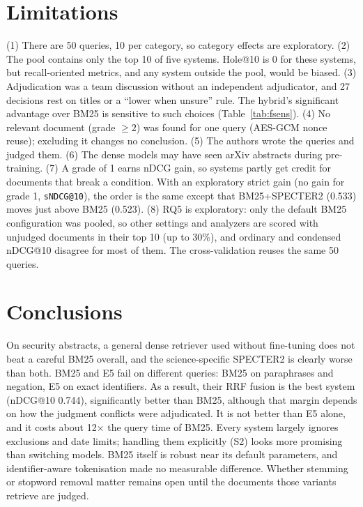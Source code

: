 \documentclass[10pt,a4paper]{article}
\begin{document}
\section{Limitations}
(1) There are 50 queries, 10 per category, so category effects are exploratory. (2) The pool contains
only the top 10 of five systems. Hole@10 is 0 for these systems, but recall-oriented metrics, and any
system outside the pool, would be biased. (3) Adjudication was a team discussion without an independent
adjudicator, and 27 decisions rest on titles or a ``lower when unsure'' rule. The hybrid's significant
advantage over BM25 is sensitive to such choices (Table~\ref{tab:fsens}). (4) No relevant document
(grade $\geq 2$) was found for one query (AES-GCM nonce reuse); excluding it changes no conclusion.
(5) The authors wrote the queries and judged them. (6) The dense models may have seen arXiv abstracts
during pre-training. (7) A grade of 1 earns nDCG gain, so systems partly get credit for documents that
break a condition. With an exploratory strict gain (no gain for grade 1, \texttt{sNDCG@10}), the order
is the same except that BM25+SPECTER2 (0.533) moves just above BM25 (0.523). (8) RQ5 is exploratory: only
the default BM25 configuration was pooled, so other settings and analyzers are scored with unjudged
documents in their top 10 (up to 30\%), and ordinary and condensed nDCG@10 disagree for most of them.
The cross-validation reuses the same 50 queries.

\section{Conclusions}
On security abstracts, a general dense retriever used without fine-tuning does not beat a careful BM25
overall, and the science-specific SPECTER2 is clearly worse than both. BM25 and E5 fail on different
queries: BM25 on paraphrases and negation, E5 on exact identifiers. As a result, their RRF fusion is the
best system (nDCG@10 0.744), significantly better than BM25, although that margin depends on how the
judgment conflicts were adjudicated. It is not better than E5 alone, and it costs about 12$\times$ the
query time of BM25. Every system largely ignores exclusions and date limits; handling them explicitly
(S2) looks more promising than switching models. BM25 itself is robust near its default parameters, and
identifier-aware tokenisation made no measurable difference. Whether stemming or stopword removal matter
remains open until the documents those variants retrieve are judged.
\end{document}
